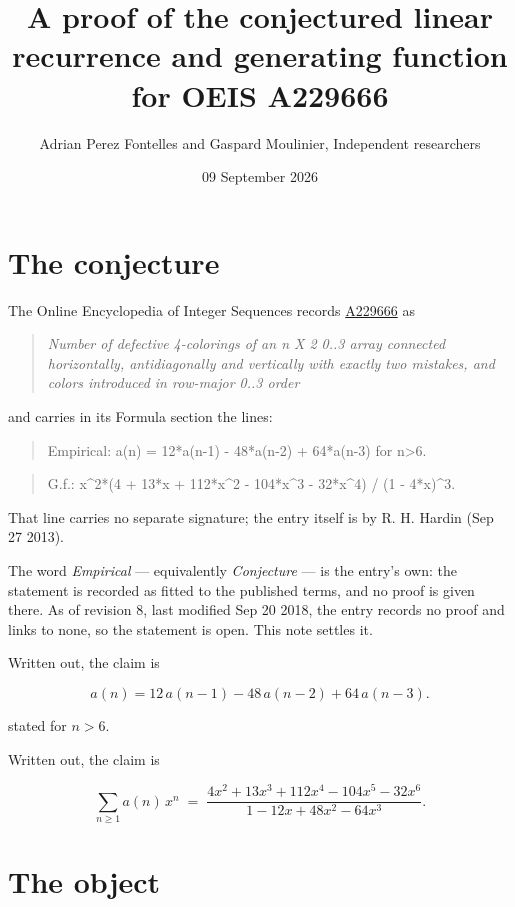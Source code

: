 \documentclass[11pt]{article}
\title{A proof of the conjectured linear recurrence and generating function for OEIS A229666}
\author{Adrian Perez Fontelles and Gaspard Moulinier, Independent researchers}
\date{09 September 2026}
\theoremstyle{definition}
\begin{document}
\maketitle
\section{The conjecture}

The Online Encyclopedia of Integer Sequences records \href{https://oeis.org/A229666}{A229666} as

\begin{quote}\itshape Number of defective 4-colorings of an n X 2 0..3 array connected horizontally, antidiagonally and vertically with exactly two mistakes, and colors introduced in row-major 0..3 order\end{quote}

and carries in its Formula section the lines:

\begin{quote}\ttfamily Empirical: a(n) = 12*a(n-1) - 48*a(n-2) + 64*a(n-3) for n>6.\end{quote}

\begin{quote}\ttfamily G.f.: x\textasciicircum{}2*(4 + 13*x + 112*x\textasciicircum{}2 - 104*x\textasciicircum{}3 - 32*x\textasciicircum{}4) / (1 - 4*x)\textasciicircum{}3.\end{quote}

That line carries no separate signature; the entry itself is by R. H. Hardin (Sep 27 2013).

The word {\itshape Empirical} --- equivalently {\itshape Conjecture} --- is the entry's own: the statement is recorded as fitted to the published terms, and no proof is given there. As of revision 8, last modified Sep 20 2018, the entry records no proof and links to none, so the statement is open. This note settles it.

Written out, the claim is

\[a(n) = 12\,a(n-1) - 48\,a(n-2) + 64\,a(n-3).\]

stated for $n > 6$.

Written out, the claim is

\[\sum_{n \ge 1} a(n)\,x^n \;=\; \frac{4x^{2} + 13x^{3} + 112x^{4} - 104x^{5} - 32x^{6}}{1 - 12x + 48x^{2} - 64x^{3}}.\]

\section{The object}
\end{document}
